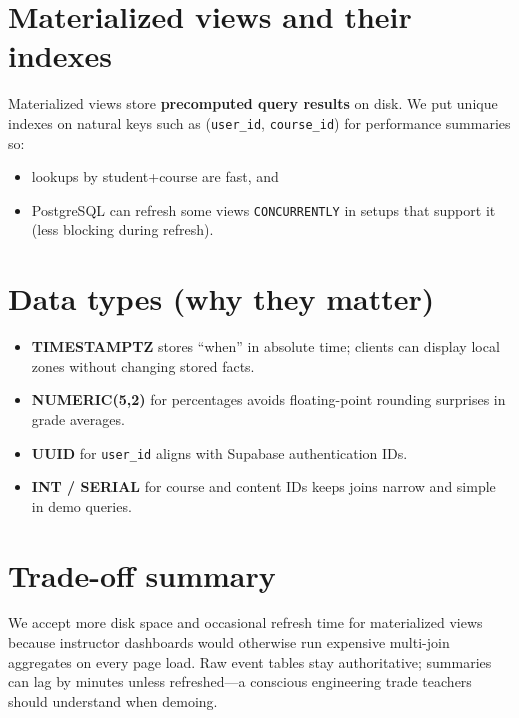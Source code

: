 \section{Materialized views and their indexes}
Materialized views store \textbf{precomputed query results} on disk. We put unique indexes on natural keys such as (\texttt{user\_id}, \texttt{course\_id}) for performance summaries so:

\begin{itemize}[leftmargin=*]
  \item lookups by student+course are fast, and
  \item PostgreSQL can refresh some views \texttt{CONCURRENTLY} in setups that support it (less blocking during refresh).
\end{itemize}

\section{Data types (why they matter)}
\begin{itemize}[leftmargin=*]
  \item \textbf{TIMESTAMPTZ} stores ``when'' in absolute time; clients can display local zones without changing stored facts.

  \item \textbf{NUMERIC(5,2)} for percentages avoids floating-point rounding surprises in grade averages.

  \item \textbf{UUID} for \texttt{user\_id} aligns with Supabase authentication IDs.

  \item \textbf{INT / SERIAL} for course and content IDs keeps joins narrow and simple in demo queries.
\end{itemize}

\section{Trade-off summary}
We accept more disk space and occasional refresh time for materialized views because instructor dashboards would otherwise run expensive multi-join aggregates on every page load. Raw event tables stay authoritative; summaries can lag by minutes unless refreshed---a conscious engineering trade teachers should understand when demoing.
